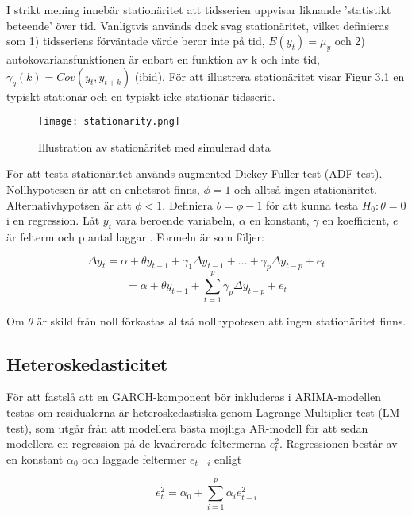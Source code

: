 \documentclass[11pt]{article}
\numberwithin{equation}{section}
\numberwithin{table}{section}
\numberwithin{figure}{section}
\begin{document}
I strikt mening innebär stationäritet att tidsserien uppvisar liknande 'statistikt beteende' över tid. Vanligtvis används dock svag stationäritet, vilket definieras som 1) tidsseriens förväntade värde beror inte på tid, \(E(y_t)=\mu_y\) och 2) autokovariansfunktionen är enbart en funktion av k och inte tid, \(\gamma_y(k) = Cov(y_t, y_{t+k})\) (ibid). För att illustrera stationäritet visar Figur 3.1 en typiskt stationär och en typiskt icke-stationär tidsserie.

\begin{figure}[H]
\caption{Illustration av stationäritet med simulerad data}
\texttt{[image: stationarity.png]}
\centering
\end{figure}

För att testa stationäritet används augmented Dickey-Fuller-test (ADF-test). Nollhypotesen är att en enhetsrot finns, \(\phi=1\) och alltså ingen stationäritet. Alternativhypotsen är att \(\phi<1\). Definiera \(\theta = \phi -1 \) för att kunna testa \(H_0:\theta=0\) i en regression. Låt \(y_t\) vara beroende variabeln, \( \alpha \) en konstant, \( \gamma \) en koefficient, \(e\) är felterm och p antal laggar \parencite[][,s.610 ff.]{wooldridge2018introductory}. Formeln är som följer:

\begin{equation}
    \Delta y_t = \alpha + \theta y_{t-1} + \gamma_1\Delta y_{t-1} + ... + \gamma_p\Delta y_{t-p} + e_t
\end{equation}
\begin{equation}
        = \alpha + \theta y_{t-1} + \sum_{t=1}^{p}\gamma_p \Delta y_{t-p} + e_t
\end{equation}

Om \(\theta\) är skild från noll förkastas alltså nollhypotesen att ingen stationäritet finns.

\subsection{Heteroskedasticitet}

För att fastslå att en GARCH-komponent bör inkluderas i ARIMA-modellen testas om residualerna är heteroskedastiska genom Lagrange Multiplier-test (LM-test), som utgår från att modellera bästa möjliga AR-modell för att sedan modellera en regression på de kvadrerade feltermerna \(e_t^2\). Regressionen består av en konstant \(\alpha_0\) och laggade feltermer \(e_{t-i}\) enligt

\begin{equation}
    e_t^2=\alpha_0+\sum_{i=1}^{p}\alpha_ie_{t-i}^2
\end{equation}
\end{document}
